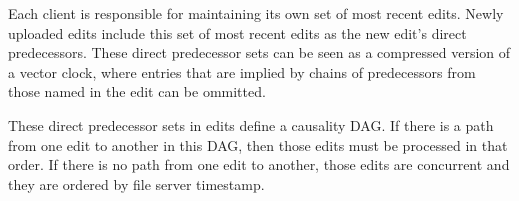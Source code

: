 \documentclass{article}
\begin{document}
Each client is responsible for maintaining its own set of most recent edits.
Newly uploaded edits include this set of most recent edits as the new edit's direct predecessors.
These direct predecessor sets can be seen as a compressed version of a vector clock, where entries that are implied by chains of predecessors from those named in the edit can be ommitted.

These direct predecessor sets in edits define a causality DAG.
If there is a path from one edit to another in this DAG, then those edits must be processed in that order.
If there is no path from one edit to another, those edits are concurrent and they are ordered by file server timestamp.
\end{document}
